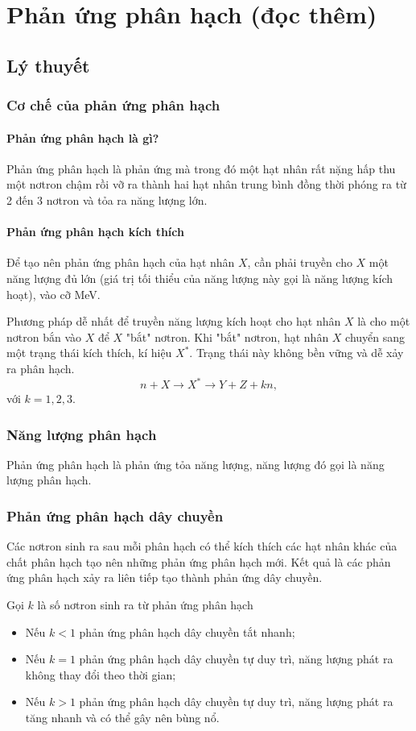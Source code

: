 
\chapter[Phản ứng phân hạch (đọc thêm)]{Phản ứng phân hạch (đọc thêm)}
\section{Lý thuyết}
\subsection{Cơ chế của phản ứng phân hạch}
\subsubsection{Phản ứng phân hạch là gì?}
Phản ứng phân hạch là phản ứng mà trong đó một hạt nhân rất nặng hấp thu một nơtron chậm rồi vỡ ra thành hai hạt nhân trung bình đồng thời phóng ra từ 2 đến 3 nơtron và tỏa ra năng lượng lớn.
\subsubsection{Phản ứng phân hạch kích thích}
Để tạo nên phản ứng phân hạch của hạt nhân $X$, cần phải truyền cho
$X$ một năng lượng đủ lớn (giá trị tối thiểu của năng lượng này gọi là năng lượng kích hoạt), vào cỡ MeV.


Phương pháp dễ nhất để truyền năng lượng kích hoạt cho hạt nhân $X$ là cho một nơtron bắn vào $X$ để $X$ "bắt" nơtron. Khi "bắt" nơtron, hạt nhân $X$ chuyển sang một trạng thái kích thích, kí hiệu $X^*$. Trạng thái này không bền vững và dễ xảy ra phân hạch.
\begin{equation}
	n+X\rightarrow X^*\rightarrow Y+Z+kn,
\end{equation}
với $k=1,2,3$.
\subsection{Năng lượng phân hạch}
Phản ứng phân hạch là phản ứng tỏa năng lượng, năng lượng đó gọi là năng lượng phân hạch.
\subsection{Phản ứng phân hạch dây chuyền}
Các nơtron sinh ra sau mỗi phân hạch có thể kích thích các hạt nhân khác của chất phân hạch tạo nên những phản ứng phân hạch mới. Kết quả là các phản ứng phân hạch xảy ra liên tiếp tạo thành phản ứng dây chuyền.

Gọi $k$ là số nơtron sinh ra từ phản ứng phân hạch
\begin{itemize}
	\item Nếu $k < 1$ phản ứng phân hạch dây chuyền tắt nhanh;
	\item Nếu $k = 1$ phản ứng phân hạch dây chuyền tự duy trì, năng lượng phát ra không thay đổi theo thời gian;
	\item Nếu $k > 1$ phản ứng phân hạch dây chuyền tự duy trì, năng lượng phát ra tăng nhanh và có thể gây nên bùng nổ.
\end{itemize}

